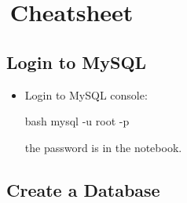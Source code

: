 \section{\,Cheatsheet}

%

\subsection{Login to MySQL}

\begin{itemize}
    \item Login to MySQL console:
    \begin{mintedbox}{bash}
mysql -u root -p
    \end{mintedbox}
    the password is in the notebook.
\end{itemize}

\subsection{Create a Database}

